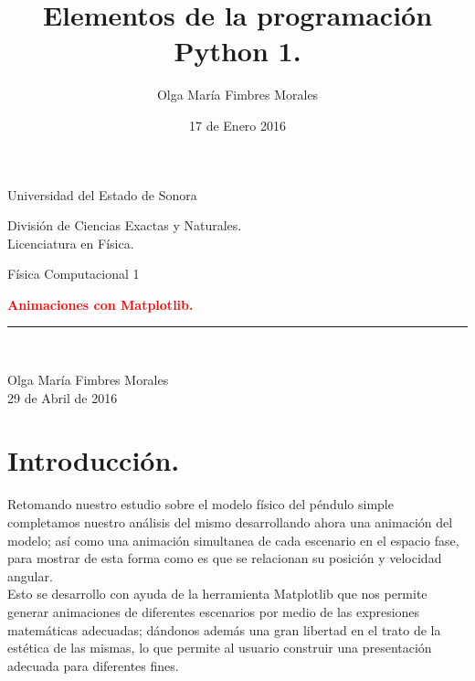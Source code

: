 \documentclass[12pt]{article}
\title{Elementos de la programación Python 1.}
\author{\textcolor{JungleGreen}{Olga María Fimbres Morales}}
\date{17 de Enero 2016}
\begin{document}
\begin{titlepage}

\begin{center}
\begin{large}
Universidad del Estado de Sonora\\
\end{large}
\vspace*{0.15in}
División de Ciencias Exactas y Naturales.\\
\vspace*{0.15in}
Licenciatura en Física. \\
\vspace*{0.6in}
\begin{large}
Física Computacional 1\\
\end{large}
\vspace*{0.2in}
\begin{Large}
\textbf{{\textcolor{Red}{Animaciones con Matplotlib.}}} \\
\end{Large}


\rule{80mm}{0.1mm}\\
\vspace*{0.1in}
\begin{large}
{\textcolor{JungleGreen}{Olga María Fimbres Morales}}\\
29 de Abril de 2016\\
\end{large}
\end{center}
\end{titlepage}

\pagebreak
\section*{Introducción.}
 Retomando nuestro estudio sobre el modelo f\'isico del p\'endulo simple completamos nuestro análisis del mismo desarrollando ahora una animación del modelo; así como una animación simultanea de cada escenario en el espacio fase, para mostrar de esta forma como es que se relacionan su posición y velocidad angular.\\

Esto se desarrollo con ayuda de la herramienta Matplotlib que nos permite generar animaciones de diferentes escenarios por medio de las expresiones matemáticas adecuadas; dándonos además una gran libertad en el trato de la estética de las mismas, lo que permite al usuario construir una presentación adecuada para diferentes fines.\\
\end{document}
